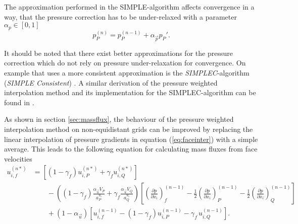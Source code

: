 The approximation performed in the SIMPLE-algorithm affects convergence in a way, that the pressure correction has to be under-relaxed with a parameter \(\alpha_p \in [0,1]\)
\begin{equation}
  \label{eq:pressupdate}
  p_P^{(n)} = p_P^{(n-1)} + \alpha_{\vec{p}} p_P'.
\end{equation}

It should be noted that there exist better approximations for the pressure correction which do not rely on pressure under-relaxation for convergence. On example that uses a more consistent approximation is the \emph{SIMPLEC}-algorithm (\emph{SIMPLE Consistent}) \cite{doormaal84}. A similar derivation of the pressure weighted interpolation method and its implementation for the SIMPLEC-algorithm can be found in \cite{miller88}.

As shown in section \ref{sec:massflux}, the behaviour of the pressure weighted interpolation method on non-equidistant grids can be improved by replacing the linear interpolation of pressure gradients in equation (\ref{eq:faceinter}) with a simple average. This leads to the following equation for calculating mass fluxes from face velocities
\begin{align}
  \label{eq:facecorr2}
  u_{i,f}^{(n*)} 
  &=
  \left[\left(1 - \gamma_f\right) u_{i,P}^{(n*)} + \gamma_f u_{i,Q}^{(n*)} \right] \nonumber\\[1em]
  &\quad\quad - 
  \left(\left(1 - \gamma_f\right) \frac{\alpha_\vec{u} V_P}{a_P^{u_i}} + \gamma_f \frac{\alpha_\vec{u} V_Q}{a_Q^{u_i}}\right)
  \left[ 
  \left(\frac{\partial p}{\partial x_i}\right)_f^{(n-1)} 
  -  \frac{1}{2} \left( \frac{\partial p}{\partial x_i} \right)_P^{(n-1)} 
  -  \frac{1}{2} \left(\frac{\partial p}{\partial x_i}\right)_Q^{(n-1)} 
  \right] \nonumber \\[1em]
  &\quad\quad + \left(1 - \alpha_\vec{u}\right) \left[ u_{i,f}^{(n-1)} - \left(1 - \gamma_f\right) u_{i,P}^{(n-1)} - \gamma_f \, u_{i,Q}^{(n-1)} \right].
\end{align}

